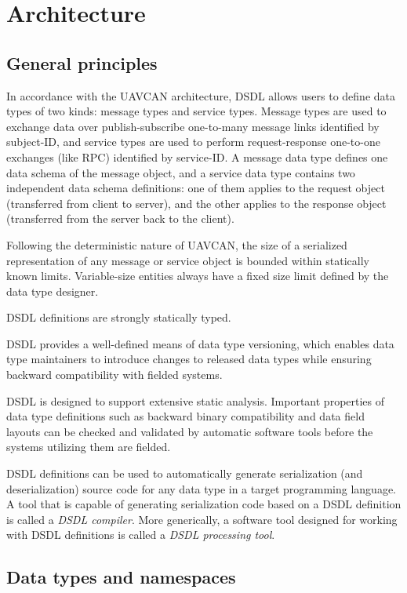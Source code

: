 \section{Architecture}

\subsection{General principles}

In accordance with the UAVCAN architecture, DSDL allows users to define data types of two kinds:
message types and service types.
Message types are used to exchange data over publish-subscribe one-to-many message links identified by subject-ID,
and service types are used to perform request-response one-to-one exchanges (like RPC) identified by service-ID.
A message data type defines one data schema of the message object,
and a service data type contains two independent data schema definitions:
one of them applies to the request object (transferred from client to server),
and the other applies to the response object (transferred from the server back to the client).

Following the deterministic nature of UAVCAN, the size of a serialized representation of any
message or service object is bounded within statically known limits.
Variable-size entities always have a fixed size limit defined by the data type designer.

DSDL definitions are strongly statically typed.

DSDL provides a well-defined means of data type versioning, which enables data type maintainers to introduce changes
to released data types while ensuring backward compatibility with fielded systems.

DSDL is designed to support extensive static analysis. Important properties of data type definitions such as
backward binary compatibility and data field layouts can be checked and validated by automatic software tools
before the systems utilizing them are fielded.

DSDL definitions can be used to automatically generate serialization (and deserialization) source code
for any data type in a target programming language.
A tool that is capable of generating serialization code based on a DSDL definition is called a \emph{DSDL compiler}.
More generically, a software tool designed for working with DSDL definitions is called a
\emph{DSDL processing tool}.

\subsection{Data types and namespaces}

